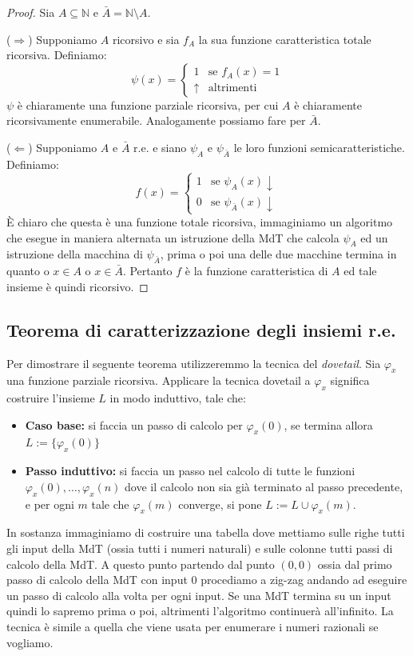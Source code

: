 \documentclass[a4paper,titlepage]{article}
\theoremstyle{definition}
\newcommand{\N}{\mathbb{N}}
\begin{document}
\begin{proof}
	Sia $A\subseteq\N$ e $\bar A=\N\setminus A$. 
	
	($\Rightarrow$) Supponiamo $A$ ricorsivo e sia $f_A$ la sua funzione caratteristica totale ricorsiva. Definiamo:
	\[
		\psi(x) =
		\begin{cases}
			1 &\text{se } f_A(x) = 1\\
			\uparrow &\text{altrimenti}
		\end{cases}
	\]
	$\psi$ è chiaramente una funzione parziale ricorsiva, per cui $A$ è chiaramente ricorsivamente enumerabile. Analogamente possiamo fare per $\bar A$.
	
	($\Leftarrow$) Supponiamo $A$ e $\bar A$ r.e. e siano $\psi_A$ e $\psi_{\bar A}$ le loro funzioni semicaratteristiche. Definiamo:
	\[
		f(x) =
		\begin{cases}
			1 &\text{se } \psi_A(x)\downarrow\\
			0 &\text{se }\psi_{\bar A}(x)\downarrow
		\end{cases}
	\]
	È chiaro che questa è una funzione totale ricorsiva, immaginiamo un algoritmo che esegue in maniera alternata un istruzione della MdT che calcola $\psi_A$ ed un istruzione della macchina di $\psi_{\bar A}$, prima o poi una delle due macchine termina in quanto o $x\in A$ o $x\in\bar A$. Pertanto $f$ è la funzione caratteristica di $A$ ed tale insieme è quindi ricorsivo. 
\end{proof}

\subsection{Teorema di caratterizzazione degli insiemi r.e.}
Per dimostrare il seguente teorema utilizzeremmo la tecnica del \textit{dovetail}. Sia $\varphi_x$ una funzione parziale ricorsiva. Applicare la tecnica dovetail a $\varphi_x$ significa costruire l'insieme $L$ in modo induttivo, tale che:
\begin{itemize}
	\item \textbf{Caso base:} si faccia un passo di calcolo per $\varphi_x(0)$, se termina allora $L:=\{\varphi_x(0)\}$
	\item \textbf{Passo induttivo:} si faccia un passo nel calcolo di tutte le funzioni $\varphi_x(0),\dots,\varphi_x(n)$ dove il calcolo non sia già terminato al passo precedente, e per ogni $m$ tale che $\varphi_x(m)$ converge, si pone $L:=L\cup{\varphi_x(m)}$.
\end{itemize}

In sostanza immaginiamo di costruire una tabella dove mettiamo sulle righe tutti gli input della MdT (ossia tutti i numeri naturali) e sulle colonne tutti passi di calcolo della MdT. A questo punto partendo dal punto $(0,0)$ ossia dal primo passo di calcolo della MdT con input 0 procediamo a zig-zag andando ad eseguire un passo di calcolo alla volta per ogni input. Se una MdT termina su un input quindi lo sapremo prima o poi, altrimenti l'algoritmo continuerà all'infinito. La tecnica è simile a quella che viene usata per enumerare i numeri razionali se vogliamo. 
\end{document}
